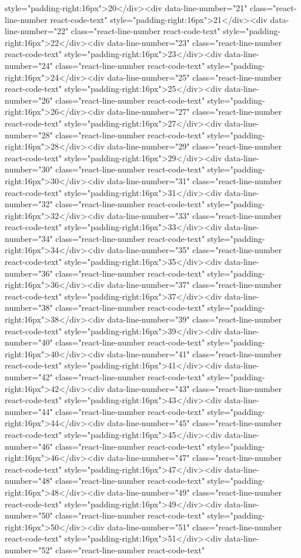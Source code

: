 {{{{{style="padding-right:16px">20</div><div data-line-number="21" class="react-line-number react-code-text" style="padding-right:16px">21</div><div data-line-number="22" class="react-line-number react-code-text" style="padding-right:16px">22</div><div data-line-number="23" class="react-line-number react-code-text" style="padding-right:16px">23</div><div data-line-number="24" class="react-line-number react-code-text" style="padding-right:16px">24</div><div data-line-number="25" class="react-line-number react-code-text" style="padding-right:16px">25</div><div data-line-number="26" class="react-line-number react-code-text" style="padding-right:16px">26</div><div data-line-number="27" class="react-line-number react-code-text" style="padding-right:16px">27</div><div data-line-number="28" class="react-line-number react-code-text" style="padding-right:16px">28</div><div data-line-number="29" class="react-line-number react-code-text" style="padding-right:16px">29</div><div data-line-number="30" class="react-line-number react-code-text" style="padding-right:16px">30</div><div data-line-number="31" class="react-line-number react-code-text" style="padding-right:16px">31</div><div data-line-number="32" class="react-line-number react-code-text" style="padding-right:16px">32</div><div data-line-number="33" class="react-line-number react-code-text" style="padding-right:16px">33</div><div data-line-number="34" class="react-line-number react-code-text" style="padding-right:16px">34</div><div data-line-number="35" class="react-line-number react-code-text" style="padding-right:16px">35</div><div data-line-number="36" class="react-line-number react-code-text" style="padding-right:16px">36</div><div data-line-number="37" class="react-line-number react-code-text" style="padding-right:16px">37</div><div data-line-number="38" class="react-line-number react-code-text" style="padding-right:16px">38</div><div data-line-number="39" class="react-line-number react-code-text" style="padding-right:16px">39</div><div data-line-number="40" class="react-line-number react-code-text" style="padding-right:16px">40</div><div data-line-number="41" class="react-line-number react-code-text" style="padding-right:16px">41</div><div data-line-number="42" class="react-line-number react-code-text" style="padding-right:16px">42</div><div data-line-number="43" class="react-line-number react-code-text" style="padding-right:16px">43</div><div data-line-number="44" class="react-line-number react-code-text" style="padding-right:16px">44</div><div data-line-number="45" class="react-line-number react-code-text" style="padding-right:16px">45</div><div data-line-number="46" class="react-line-number react-code-text" style="padding-right:16px">46</div><div data-line-number="47" class="react-line-number react-code-text" style="padding-right:16px">47</div><div data-line-number="48" class="react-line-number react-code-text" style="padding-right:16px">48</div><div data-line-number="49" class="react-line-number react-code-text" style="padding-right:16px">49</div><div data-line-number="50" class="react-line-number react-code-text" style="padding-right:16px">50</div><div data-line-number="51" class="react-line-number react-code-text" style="padding-right:16px">51</div><div data-line-number="52" class="react-line-number react-code-text" }}}}}
